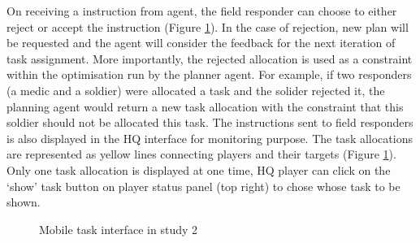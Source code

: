 On receiving a instruction from agent, the field responder can choose to either reject or accept the instruction (Figure \ref{fig:study2mobiletask}). In the case of rejection, new plan will be requested and the agent will consider the feedback for the next iteration of task assignment. More importantly, the rejected allocation is used as a constraint within the optimisation run by the planner agent. For example, if two responders (a medic and a soldier) were allocated a task and the solider rejected it, the planning agent would return a new task allocation with the constraint that this soldier should not be allocated this task. The instructions sent to field responders is also displayed in the HQ interface for monitoring purpose. The task allocations are represented as yellow lines connecting players and their targets (Figure \ref{fig:study2mobiletask}). Only one task allocation is displayed at one time, HQ player can click on the `show' task button on player status panel (top right) to chose whose task to be shown.  \\

\begin{figure}[h]
  \centering
  \caption{Mobile task interface in study 2}
  \label{fig:study2mobiletask}
\end{figure}

